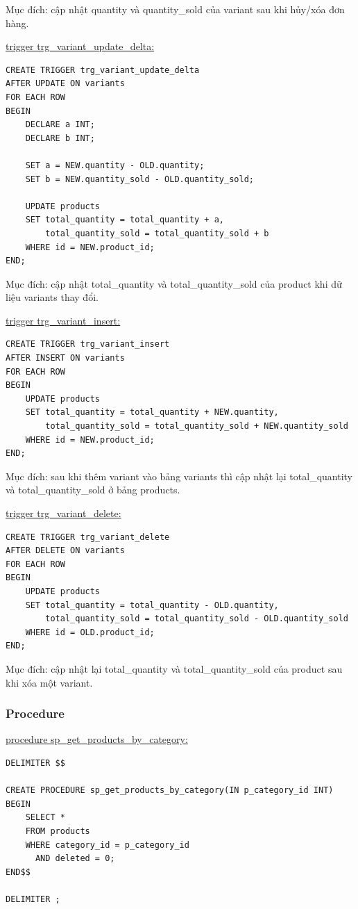Mục đích: cập nhật quantity và quantity\_sold của variant sau khi hủy/xóa đơn hàng.

\underline{trigger trg\_variant\_update\_delta:}

\begin{verbatim}
CREATE TRIGGER trg_variant_update_delta
AFTER UPDATE ON variants
FOR EACH ROW
BEGIN
    DECLARE a INT;
    DECLARE b INT;

    SET a = NEW.quantity - OLD.quantity;
    SET b = NEW.quantity_sold - OLD.quantity_sold;

    UPDATE products
    SET total_quantity = total_quantity + a,
        total_quantity_sold = total_quantity_sold + b
    WHERE id = NEW.product_id;
END;
\end{verbatim}

Mục đích: cập nhật total\_quantity và total\_quantity\_sold của product khi dữ liệu variants thay đổi.

\underline{trigger trg\_variant\_insert:}

\begin{verbatim}
CREATE TRIGGER trg_variant_insert
AFTER INSERT ON variants
FOR EACH ROW
BEGIN
    UPDATE products
    SET total_quantity = total_quantity + NEW.quantity,
        total_quantity_sold = total_quantity_sold + NEW.quantity_sold
    WHERE id = NEW.product_id;
END;
\end{verbatim}

Mục đích: sau khi thêm variant vào bảng variants thì cập nhật lại total\_quantity và total\_quantity\_sold ở bảng products.

\underline{trigger trg\_variant\_delete:}

\begin{verbatim}
CREATE TRIGGER trg_variant_delete
AFTER DELETE ON variants
FOR EACH ROW
BEGIN
    UPDATE products
    SET total_quantity = total_quantity - OLD.quantity,
        total_quantity_sold = total_quantity_sold - OLD.quantity_sold
    WHERE id = OLD.product_id;
END;
\end{verbatim}

Mục đích: cập nhật lại total\_quantity và total\_quantity\_sold của product sau khi xóa một variant.

\subsubsection{Procedure}

\underline{procedure sp\_get\_products\_by\_category:}

\begin{verbatim}
DELIMITER $$

CREATE PROCEDURE sp_get_products_by_category(IN p_category_id INT)
BEGIN
    SELECT *
    FROM products
    WHERE category_id = p_category_id
      AND deleted = 0;
END$$

DELIMITER ;
\end{verbatim}


